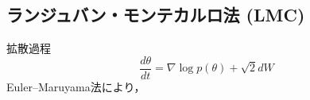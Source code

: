 \subsection{ランジュバン・モンテカルロ法 (LMC)}拡散過程
$$
{\frac{d\theta}{dt}}=\nabla \log p (\theta)+{\sqrt 2}{d{W}}
$$
Euler–Maruyama法により，